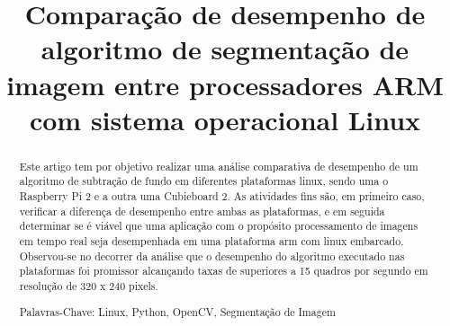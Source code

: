 \documentclass[conference]{IEEEtran}
\begin{document}
%
\title{Comparação de desempenho de algoritmo de segmentação de imagem entre processadores ARM com sistema operacional Linux}


\author{

}

\maketitle

\begin{abstract}
Este artigo tem por objetivo realizar uma análise comparativa de desempenho de um algoritmo de subtração de fundo em diferentes plataformas linux, sendo uma o Raspberry Pi 2 e a outra uma Cubieboard 2. As atividades fins são, em primeiro caso, verificar a diferença de desempenho entre ambas as plataformas, e em seguida determinar se é viável que uma aplicação com o propósito processamento de imagens em tempo real seja desempenhada em uma plataforma arm com linux embarcado. Observou-se no decorrer da análise que o desempenho do algoritmo executado nas plataformas foi promissor alcançando taxas de superiores a 15 quadros por segundo em resolução de 320 x 240 pixels.

Palavras-Chave: Linux, Python, OpenCV, Segmentação de Imagem
\end{abstract}
\end{document}

